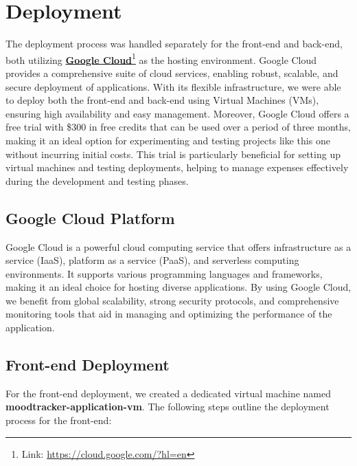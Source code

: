 \section{Deployment}

The deployment process was handled separately for the front-end and back-end, both utilizing \textbf{\href{https://cloud.google.com/?hl=en}{Google Cloud}}\footnote{Link: \url{https://cloud.google.com/?hl=en}} as the hosting environment. Google Cloud provides a comprehensive suite of cloud services, enabling robust, scalable, and secure deployment of applications. With its flexible infrastructure, we were able to deploy both the front-end and back-end using Virtual Machines (VMs), ensuring high availability and easy management. Moreover, Google Cloud offers a free trial with \$300 in free credits that can be used over a period of three months, making it an ideal option for experimenting and testing projects like this one without incurring initial costs. This trial is particularly beneficial for setting up virtual machines and testing deployments, helping to manage expenses effectively during the development and testing phases.

\subsection{Google Cloud Platform}

Google Cloud is a powerful cloud computing service that offers infrastructure as a service (IaaS), platform as a service (PaaS), and serverless computing environments. It supports various programming languages and frameworks, making it an ideal choice for hosting diverse applications. By using Google Cloud, we benefit from global scalability, strong security protocols, and comprehensive monitoring tools that aid in managing and optimizing the performance of the application.

\subsection{Front-end Deployment}

For the front-end deployment, we created a dedicated virtual machine named \textbf{moodtracker-application-vm}. The following steps outline the deployment process for the front-end:

